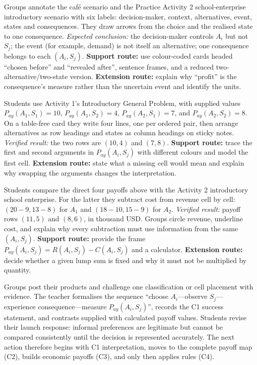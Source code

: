 \documentclass[10pt,letterpaper]{article}
\newcommand{\partheading}[1]{\Needspace{6\baselineskip}\par\vspace{5pt}{\bfseries #1\par}\vspace{1pt}}
\begin{document}
\begin{bluebox}
		\partheading{Station 1---Who controls what?}
		Groups annotate the caf\'e scenario and the Practice Activity 2 school-enterprise
		introductory scenario with six labels: decision-maker, context, alternatives,
		event, states and consequences. They draw arrows from the choice and the
		realised state to one consequence. \textit{Expected conclusion:} the
		decision-maker controls $A_i$ but not $S_j$; the event (for example, demand) is
		not itself an alternative; one consequence belongs to each $(A_i,S_j)$.
		\textbf{Support route:} use colour-coded cards headed ``chosen before'' and
		``revealed after'', sentence frames, and a reduced two-alternative/two-state
		version. \textbf{Extension route:} explain why ``profit'' is the consequence's
		measure rather than the uncertain event and identify the units.
		
		\partheading{Station 2---From narrative to payoff map}
		Students use Activity 1's Introductory General Problem, with supplied values
		$P_{ay}(A_1,S_1)=10$, $P_{ay}(A_1,S_2)=4$,
		$P_{ay}(A_2,S_1)=7$, and $P_{ay}(A_2,S_2)=8$. On a table-free card they write
		four lines, one per ordered pair, then arrange alternatives as row headings and
		states as column headings on sticky notes. \textit{Verified result:} the two
		rows are $(10,4)$ and $(7,8)$. \textbf{Support route:} trace the first and
		second arguments in $P_{ay}(A_i,S_j)$ with different colours and model the
		first cell. \textbf{Extension route:} state what a missing cell would mean and
		explain why swapping the arguments changes the interpretation.
		
		\partheading{Station 3---Is the number supplied or built?}
		Students compare the direct four payoffs above with the Activity 2 introductory
		school enterprise. For the latter they subtract cost from revenue cell by cell:
		$(20-9,13-8)$ for $A_1$ and $(18-10,15-9)$ for $A_2$.
		\textit{Verified result:} payoff rows $(11,5)$ and $(8,6)$, in thousand USD.
		Groups circle revenue, underline cost, and explain why every subtraction must
		use information from the same $(A_i,S_j)$. \textbf{Support route:} provide the
		frame $P_{ay}(A_i,S_j)=R(A_i,S_j)-C(A_i,S_j)$ and a calculator. \textbf{Extension
			route:} decide whether a given lump sum is fixed and why it must not be
		multiplied by quantity.
		
		\partheading{Whole-class synthesis and transition}
		Groups post their products and challenge one classification or cell placement
		with evidence. The teacher formalises the sequence ``choose $A_i$---observe
		$S_j$---experience consequence---measure $P_{ay}(A_i,S_j)$'', records the C1
		success statement, and contrasts supplied with calculated payoff values.
		Students revise their launch response: informal preferences are legitimate but
		cannot be compared consistently until the decision is represented accurately.
		The next action therefore begins with C1 interpretation, moves to the complete
		payoff map (C2), builds economic payoffs (C3), and only then applies rules (C4).
	\end{bluebox}
	
\end{document}
